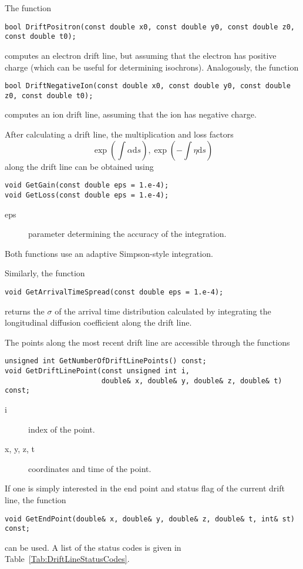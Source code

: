 The function 
\begin{lstlisting}
bool DriftPositron(const double x0, const double y0, const double z0, const double t0);
\end{lstlisting}
computes an electron drift line, but assuming that the electron has positive charge 
(which can be useful for determining isochrons). Analogously, the function
\begin{lstlisting}
bool DriftNegativeIon(const double x0, const double y0, const double z0, const double t0);
\end{lstlisting}
computes an ion drift line, assuming that the ion has negative charge.

After calculating a drift line, the multiplication and loss factors 
\begin{equation*}
  \exp\left(\int\alpha\text{d}s\right), \exp\left(-\int\eta\text{d}s\right)
\end{equation*}
along the drift line can be obtained using 
\begin{lstlisting}
void GetGain(const double eps = 1.e-4);
void GetLoss(const double eps = 1.e-4);
\end{lstlisting}
\begin{description}
  \item[eps] parameter determining the accuracy of the integration.
\end{description}
Both functions use an adaptive Simpson-style integration.

Similarly, the function
\begin{lstlisting}
void GetArrivalTimeSpread(const double eps = 1.e-4);
\end{lstlisting}
returns the $\sigma$ of the arrival time distribution calculated by 
integrating the longitudinal diffusion coefficient along the drift line. 

The points along the most recent drift line are accessible through the functions
\begin{lstlisting}
unsigned int GetNumberOfDriftLinePoints() const;
void GetDriftLinePoint(const unsigned int i, 
                       double& x, double& y, double& z, double& t) const;
\end{lstlisting}
\begin{description}
  \item[i] index of the point.
  \item[x, y, z, t] coordinates and time of the point. 
\end{description}
If one is simply interested in the end point and status flag of the 
current drift line, the function
\begin{lstlisting}
void GetEndPoint(double& x, double& y, double& z, double& t, int& st) const;
\end{lstlisting}
can be used. A list of the status codes 
is given in Table~\ref{Tab:DriftLineStatusCodes}.


